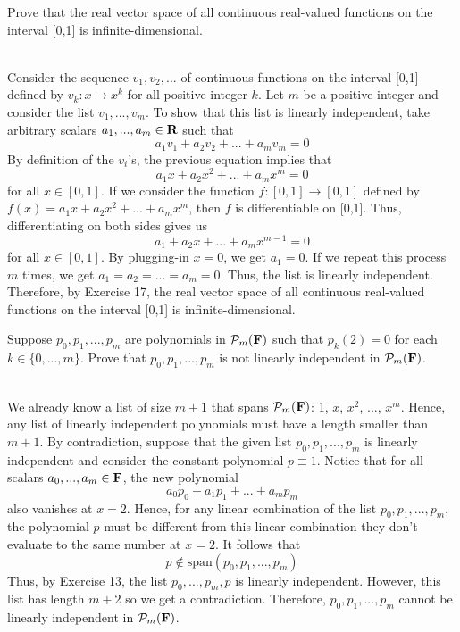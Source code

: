 \begin{exercise}
    Prove that the real vector space of all continuous real-valued functions on the interval [0,1] is infinite-dimensional. \\
\end{exercise}

\begin{solution}
    \\ Consider the sequence $v_1, v_2, ...$ of continuous functions on the interval [0,1] defined by $v_k: x \mapsto x^k$ for all positive integer $k$. Let $m$ be a positive integer and consider the list $v_1, ..., v_m$. To show that this list is linearly independent, take arbitrary scalars $a_1, ..., a_m \in \mathbf{R}$ such that
    $$a_1 v_1 + a_2 v_2 + ... + a_m v_m = 0$$
    By definition of the $v_i$'s, the previous equation implies that
    $$a_1 x + a_2 x^2 + ... + a_m x^m = 0$$
    for all $x \in [0,1]$. If we consider the function $f : [0,1] \to [0,1]$ defined by $f(x) = a_1 x + a_2 x^2 + ... + a_m x^m$, then $f$ is differentiable on [0,1]. Thus, differentiating on both sides gives us
    $$a_1 + a_2 x + ... + a_m x^{m-1} = 0$$
    for all $x \in [0,1]$. By plugging-in $x=0$, we get $a_1 = 0$. If we repeat this process $m$ times, we get $a_1 = a_2 = ... = a_m = 0$. Thus, the list is linearly independent. Therefore, by Exercise 17, the real vector space of all continuous real-valued functions on the interval [0,1] is infinite-dimensional. \\
\end{solution}

\begin{exercise}
    Suppose $p_0, p_1, ..., p_m$ are polynomials in $\mathcal{P}_m(\mathbf{F})$ such that $p_k(2) = 0$ for each $k \in \{0, ..., m\}$. Prove that $p_0, p_1, ..., p_m$ is not linearly independent in $\mathcal{P}_m(\mathbf{F})$.\\
\end{exercise}

\begin{solution}
    \\ We already know a list of size $m+1$ that spans $\mathcal{P}_m(\mathbf{F})$: 1, $x$, $x^2$, ..., $x^m$. Hence, any list of linearly independent polynomials must have a length smaller than $m+1$. By contradiction, suppose that the given list $p_0, p_1, ..., p_m$ is linearly independent and consider the constant polynomial $p \equiv 1$. Notice that for all scalars $a_0, ..., a_m \in \mathbf{F}$, the new polynomial
    $$a_0 p_0 + a_1 p_1 + ... + a_m p_m$$
    also vanishes at $x=2$. Hence, for any linear combination of the list $p_0, p_1, ..., p_m$, the polynomial $p$ must be different from this linear combination they don't evaluate to the same number at $x=2$. It follows that
    $$p \notin \text{span}(p_0, p_1, ..., p_m)$$
    Thus, by Exercise 13, the list $p_0, ..., p_m, p$ is linearly independent. However, this list has length $m+2$ so we get a contradiction. Therefore, $p_0, p_1, ..., p_m$ cannot be linearly independent in $\mathcal{P}_m(\mathbf{F})$.\\
\end{solution}